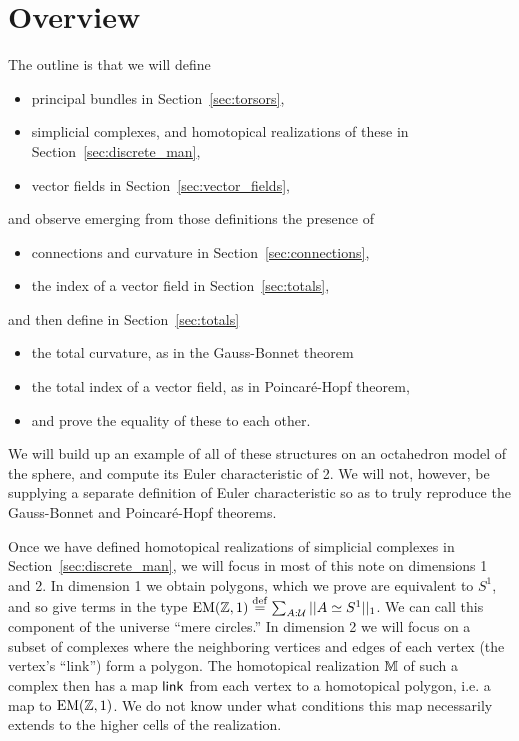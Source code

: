 \section{Overview}

The outline is that we will define 
\begin{itemize}
\item principal bundles in Section~\ref{sec:torsors},
\item simplicial complexes, and homotopical realizations of these in Section~\ref{sec:discrete_man},
\item vector fields in Section~\ref{sec:vector_fields},
\end{itemize}
and observe emerging from those definitions the presence of
\begin{itemize}
\item connections and curvature in Section~\ref{sec:connections},
\item the index of a vector field in Section~\ref{sec:totals},
\end{itemize}
and then define in Section~\ref{sec:totals}
\begin{itemize}
\item the total curvature, as in the Gauss-Bonnet theorem
\item the total index of a vector field, as in Poincaré-Hopf theorem,
\item and prove the equality of these to each other.
\end{itemize}

We will build up an example of all of these structures on an octahedron model of the sphere, and compute its Euler characteristic of 2. We will not, however, be supplying a separate definition of Euler characteristic so as to truly reproduce the Gauss-Bonnet and Poincaré-Hopf theorems.

Once we have defined homotopical realizations of simplicial complexes in Section~\ref{sec:discrete_man}, we will focus in most of this note on dimensions 1 and 2. In dimension 1 we obtain polygons, which we prove are equivalent to \( S^1 \), and so give terms in the type \( \mathrm{EM}(\mathbb{Z},1)\stackrel{\mathrm{def}}{=} \sum_{A:\mathcal{U}}||A\simeq S^1||_1 \). We can call this component of the universe ``mere circles.'' In dimension 2 we will focus on a subset of complexes where the neighboring vertices and edges of each vertex (the vertex's ``link'') form a polygon. The homotopical realization \( \mathbb{M} \) of such a complex then has a map \( \operatorname{\mathsf{link}} \) from each vertex to a homotopical polygon, i.e. a map to \( \mathrm{EM}(\mathbb{Z},1) \). We do not know under what conditions this map necessarily extends to the higher cells of the realization.

